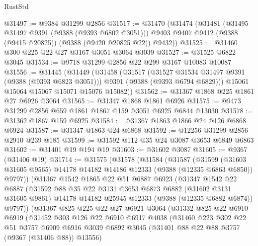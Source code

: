 \begin{lexlean}{RustStd}
\begin{coremodule}
@31497 := @9384 @31299 @2856
@31517 := @31470
    (@31474
      (@31481
        (@31495 @31497 @9391 (@9388 (@9393 @6802 @3051)))
        @9403
        @9407
        @9412
        (@9388 (@9415 @20825))
        (@9388 (@9420 @20825 @22))
        @9432))
@31525 := @31460 @300 @225 @22 @27 @3167 @3051 @3064 @3039
@31527 := @31525 @6822 @3045
@31534 := @9718 @31299 @2856 @22 @299 @3167 @10083 @10087
@31556 := @31445
    (@31449
      (@31458
        (@31517
          (@31527 @31534 @31497 @9391 (@9388 (@9393 @6823 @3051)))
          @9391
          (@9388 (@9393 @6794 @6829)))
        @15061
        @15064
        @15067
        @15071
        @15076
        @15082))
@31562 := @31367 @1868 @225 @1861 @27 @6926 @3064
@31565 := @31347 @1868 @1861 @6926
@31575 := @9473 @31299 @2856 @659 @1861 @1867 @159 @3051 @6925 @6844 @13030
@31578 := @31362 @1867 @159 @6925
@31584 := @31367 @1863 @1866 @24 @126 @6868 @6924
@31587 := @31347 @1863 @24 @6868
@31592 := @12256 @31299 @2856 @2910 @239 @185
@31599 := @31592 @112 @35 @24 @3087 @3653 @6849 @6863
@31602 := @31401 @19 @194 @19
@31603 := @31602 @3087
@31605 := @9367 (@31406 @19)
@31714 := @31575
    (@31578
      (@31584
        (@31587
          (@31599
            (@31603 @31605 @9565)
            @14178
            @14182
            @14186
            @12333
            (@9388 (@12335 @6863 @6850))
            @9797))
        (@31367
          @1542
          @1865
          @22
          @51
          @6887
          @6923
          (@31347
            @1542
            @22
            @6887
            (@31592
              @88
              @35
              @22
              @3131
              @3653
              @6873
              @6882
              (@31602 @3131 @31605 @9861)
              @14178
              @14182
              @25945
              @12333
              (@9388 (@12335 @6882 @6874))
              @9797))
          (@31367
            @825
            @225
            @22
            @27
            @6921
            @3064
            (@31332
              @825
              @22
              @6910
              @6919
              (@31452
                @303
                @126
                @22
                @6910
                @6917
                @4038
                (@31460
                  @223
                  @302
                  @22
                  @51
                  @3757
                  @6909
                  @6916
                  @3039
                  @6892
                  @3045
                  (@31401 @88 @22 @88 @3757 (@9367 (@31406 @88)) @13556)

\end{coremodule}
\end{lexlean}
